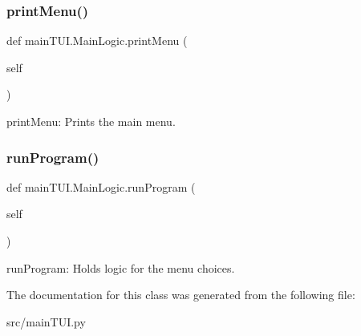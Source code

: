 \subsubsection{\texorpdfstring{print\+Menu()}{printMenu()}}
{\footnotesize\ttfamily def main\+T\+U\+I.\+Main\+Logic.\+print\+Menu (\begin{DoxyParamCaption}\item[{}]{self }\end{DoxyParamCaption})}

\begin{DoxyVerb}printMenu: Prints the main menu. \end{DoxyVerb}
 \hypertarget{classmain_t_u_i_1_1_main_logic_a174991d65104326c736a0d8e3c3e8edd}{}\label{classmain_t_u_i_1_1_main_logic_a174991d65104326c736a0d8e3c3e8edd} 
\subsubsection{\texorpdfstring{run\+Program()}{runProgram()}}
{\footnotesize\ttfamily def main\+T\+U\+I.\+Main\+Logic.\+run\+Program (\begin{DoxyParamCaption}\item[{}]{self }\end{DoxyParamCaption})}

\begin{DoxyVerb}runProgram: Holds logic for the menu choices. \end{DoxyVerb}
 

The documentation for this class was generated from the following file\+:\begin{DoxyCompactItemize}
\item 
src/main\+T\+U\+I.\+py\end{DoxyCompactItemize}
